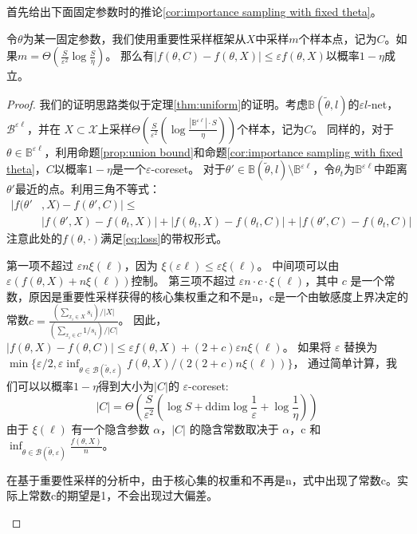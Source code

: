 首先给出下面固定参数时的推论\ref{cor:importance sampling with fixed theta}。
\begin{corollary}
    令$\theta$为某一固定参数，我们使用重要性采样框架从$X$中采样$m$个样本点，记为$C$。如果$m=\Theta\left(\frac{S}{\varepsilon^2}\log \frac S \eta\right)$。
    那么有$\left|f(\theta,C)-f(\theta,X)\right|\le \varepsilon f(\theta,X)$以概率$1-\eta$成立。
    \label{cor:importance sampling with fixed theta}
\end{corollary}
\begin{proof}
    我们的证明思路类似于定理\ref{thm:uniform}的证明。考虑$\mathbb{B}(\tilde{\theta},l)$的$\varepsilon l$-net，$\mathcal{B}^{\varepsilon \ell}$，并在
    $X\subset \mathcal{X}$上采样$\Theta\left(\frac{S}{\varepsilon^2}\left(\log \frac {\left|\mathbb{B}^{\varepsilon \ell}\right|\cdot S} {\eta} \right)\right)$个样本，记为$C$。
    同样的，对于$\theta \in \mathbb{B}^{\varepsilon \ell}$，利用命题\ref{prop:union bound}和命题\ref{cor:importance sampling with fixed theta}，$C$以概率$1-\eta$是一个$\varepsilon$-coreset。
    对于$\theta' \in \mathbb{B}(\tilde{\theta},l)\setminus \mathbb{B}^{\varepsilon \ell}$，令$\theta_t$为$\mathbb{B}^{\varepsilon \ell}$中距离$\theta'$最近的点。利用三角不等式：
    \begin{align*}
        |f(\theta'&,X)-f(\theta',C)|\leq \\
        &|f(\theta',X)-f(\theta_t,X)|+|f(\theta_t,X)-f(\theta_t,C)|+|f(\theta',C)-f(\theta_t,C)|
    \end{align*}
    注意此处的$f(\theta,\cdot)$满足\ref{eq:loss}的带权形式。
    
    第一项不超过 $\varepsilon n \xi(\ell)$，因为 $\xi(\varepsilon \ell) \leq \varepsilon \xi(\ell)$。
    中间项可以由 $\varepsilon (f(\theta, X) + n \xi(\ell))$控制。
    第三项不超过 $\varepsilon n \cdot c \cdot \xi(\ell)$，其中 $c$ 是一个常数，原因是重要性采样获得的核心集权重之和不是n，c是一个由敏感度上界决定的常数$c=\frac{(\sum_{x_i\in X}s_i)/|X|}{(\sum_{x_i \in C}1/s_i)/|C|}$。
    因此，$|f(\theta, X) - f(\theta, C)| \leq \varepsilon f(\theta, X) + (2+c) \varepsilon n \xi(\ell)$。
    如果将 $\varepsilon$ 替换为 $\min \{\varepsilon / 2, \varepsilon \inf_{\theta \in \mathcal{B}(\tilde{\theta}, \varepsilon)} f(\theta, X) / (2(2+c)n \xi(\ell))\}$，
    通过简单计算，我们可以以概率$1-\eta$得到大小为$|C|$的 $\varepsilon$-coreset:
\begin{equation}
|C| = \Theta \left( \frac{S}{\varepsilon^2} \left( \log S+\text{ddim} \log \frac{1}{\varepsilon} + \log \frac{1}{\eta} \right) \right)
\end{equation}
由于 $\xi(\ell)$ 有一个隐含参数 $\alpha$，$|C|$ 
的隐含常数取决于 $\alpha$，c 和
$\inf_{\theta \in \mathcal{B}(\tilde{\theta}, \varepsilon)} \frac{f(\theta, X)}{n}$。
\begin{remark}
    在基于重要性采样的分析中，由于核心集的权重和不再是n，式中出现了常数c。实际上常数c的期望是1，不会出现过大偏差。
\end{remark}

\end{proof}

